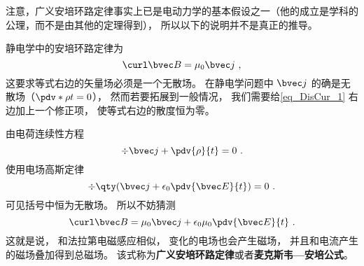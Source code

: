 注意，广义安培环路定律事实上已是电动力学的基本假设之一（他的成立是学科的公理，而不是由其他的定理得到）， 所以以下的说明并不是真正的推导。

静电学中的安培环路定律为
\begin{equation}\label{eq_DisCur_1}
\curl\bvec B = \mu_0\bvec j~,
\end{equation}
这要求等式右边的矢量场必须是一个无散场。 在静电学问题中 $\bvec j$ 的确是无散场（$\pdv*{\rho}{t} = 0$）， 然而若要拓展到一般情况， 我们需要给\autoref{eq_DisCur_1} 右边加上一个修正项， 使等式右边的散度恒为零。

由电荷连续性方程
\begin{equation}
\div \bvec j + \pdv{\rho}{t} = 0~.
\end{equation}
使用电场高斯定律
\begin{equation}
\div \qty(\bvec j + \epsilon_0\pdv{\bvec E}{t}) = 0~.
\end{equation}
可见括号中恒为无散场。 所以不妨猜测
\begin{equation}
\curl\bvec B = \mu_0\bvec j + \epsilon_0\mu_0\pdv{\bvec E}{t}~.
\end{equation}
这就是说， 和法拉第电磁感应相似， 变化的电场也会产生磁场， 并且和电流产生的磁场叠加得到总磁场。 该式称为\textbf{广义安培环路定律}或者\textbf{麦克斯韦—安培公式}。

